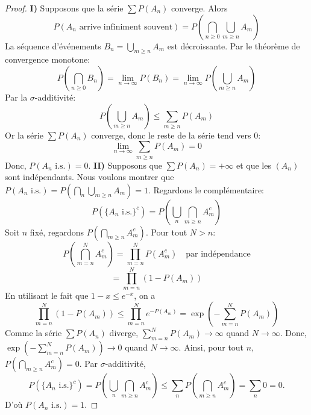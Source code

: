 \begin{proof}
\textbf{I)} Supposons que la série $\sum P(A_n)$ converge. Alors
\begin{equation*}
    P(A_n \text{ arrive infiniment souvent}) = P(\bigcap_{n \ge 0} \bigcup_{m \ge n} A_m)
\end{equation*}
La séquence d'événements $B_n = \bigcup_{m \ge n} A_m$ est décroissante.
Par le théorème de convergence monotone:
\begin{equation*}
    P(\bigcap_{n \ge 0} B_n) = \lim_{n \to \infty} P(B_n) = \lim_{n \to \infty} P(\bigcup_{m \ge n} A_m)
\end{equation*}
Par la $\sigma$-additivité:
\begin{equation*}
    P(\bigcup_{m \ge n} A_m) \le \sum_{m \ge n} P(A_m)
\end{equation*}
Or la série $\sum P(A_n)$ converge, donc le reste de la série tend vers 0:
\begin{equation*}
    \lim_{n \to \infty} \sum_{m \ge n} P(A_m) = 0
\end{equation*}
Donc, $P(A_n \text{ i.s.}) = 0$.
\vspace{1cm}
\textbf{II)} Supposons que $\sum P(A_n) = +\infty$ et que les $(A_n)$ sont indépendants.
Nous voulons montrer que $P(A_n \text{ i.s.}) = P(\bigcap_{n} \bigcup_{m \ge n} A_m) = 1$.
Regardons le complémentaire:
\begin{equation*}
    P(\{A_n \text{ i.s.}\}^c) = P(\bigcup_{n} \bigcap_{m \ge n} A_m^c)
\end{equation*}
Soit $n$ fixé, regardons $P(\bigcap_{m \ge n} A_m^c)$.
Pour tout $N > n$:
\begin{equation*}
    P(\bigcap_{m=n}^N A_m^c) = \prod_{m=n}^N P(A_m^c) \quad \text{par indépendance}
\end{equation*}
\begin{equation*}
    = \prod_{m=n}^N (1 - P(A_m))
\end{equation*}
En utilisant le fait que $1-x \le e^{-x}$, on a
\begin{equation*}
    \prod_{m=n}^N (1 - P(A_m)) \le \prod_{m=n}^N e^{-P(A_m)} = \exp\left(-\sum_{m=n}^N P(A_m)\right)
\end{equation*}
Comme la série $\sum P(A_n)$ diverge, $\sum_{m=n}^N P(A_m) \to \infty$ quand $N \to \infty$.
Donc, $\exp(-\sum_{m=n}^N P(A_m)) \to 0$ quand $N \to \infty$.
Ainsi, pour tout $n$, $P(\bigcap_{m \ge n} A_m^c) = 0$.
Par $\sigma$-additivité,
\begin{equation*}
    P(\{A_n \text{ i.s.}\}^c) = P(\bigcup_{n} \bigcap_{m \ge n} A_m^c) \le \sum_n P(\bigcap_{m \ge n} A_m^c) = \sum_n 0 = 0.
\end{equation*}
D'où $P(A_n \text{ i.s.}) = 1$.
\end{proof}
